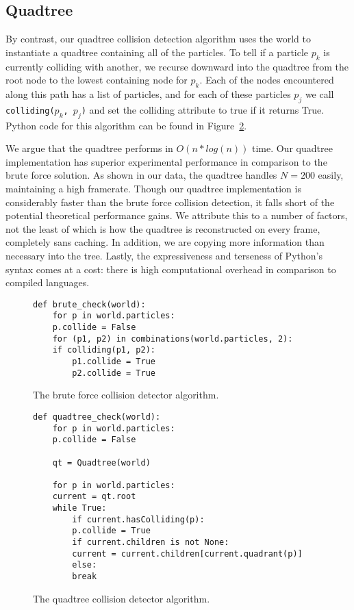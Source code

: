       \subsection{Quadtree}
	By contrast, our quadtree collision detection algorithm uses the
	world to instantiate a quadtree containing all of the particles.
	To tell if a particle $p_k$ is currently colliding with another,
	we recurse downward into the quadtree from the root node to the
	lowest containing node for $p_k$. Each of the nodes encountered
	along this path has a list of particles, and for each of these
	particles $p_j$ we call \texttt{colliding($p_k$, $p_j$)} and set
	the colliding attribute to true if it returns True.  Python code
	for this algorithm can be found in Figure~\ref{figure:quadtree}.

	\par We argue that the quadtree performs in $O(n*log(n))$ time.
	Our quadtree implementation has superior experimental
	performance in comparison to the brute force solution. As shown
	in our data, the quadtree handles $N = 200$ easily, maintaining
	a high framerate.  Though our quadtree implementation is
	considerably faster than the brute force collision detection, it
	falls short of the potential theoretical performance gains. We
	attribute this to a number of factors, not the least of which is
	how the quadtree is reconstructed on every frame, completely
	sans caching. In addition, we are copying more information than
	necessary into the tree. Lastly, the expressiveness and
	terseness of Python’s syntax comes at a cost: there is high
	computational overhead in comparison to compiled languages.


    \begin{figure}[hb]
      \begin{verbatim}
def brute_check(world):
    for p in world.particles:
	p.collide = False
    for (p1, p2) in combinations(world.particles, 2):
	if colliding(p1, p2):
	    p1.collide = True
	    p2.collide = True
      \end{verbatim}
      \caption{The brute force collision detector algorithm.}
      \label{figure:brute}
    \end{figure}

    \begin{figure}
      \begin{verbatim}
def quadtree_check(world):
    for p in world.particles:
	p.collide = False

    qt = Quadtree(world)

    for p in world.particles:
	current = qt.root
	while True:
	    if current.hasColliding(p):
		p.collide = True
	    if current.children is not None:
		current = current.children[current.quadrant(p)]
	    else:
		break
      \end{verbatim}
      \caption{The quadtree collision detector algorithm.}
      \label{figure:quadtree}
    \end{figure}

